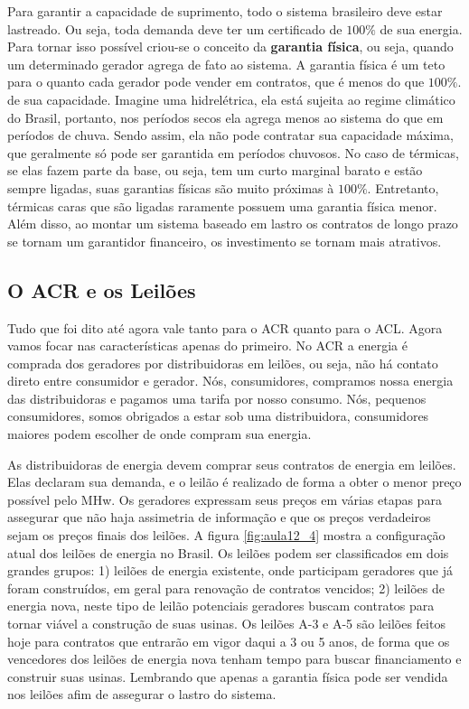 Para garantir a capacidade de suprimento, todo o sistema brasileiro deve estar lastreado. Ou seja, toda demanda deve ter um certificado de $100\%$ de sua energia. Para tornar isso possível criou-se o conceito da \textbf{garantia física}, ou seja, quando um determinado gerador agrega de fato ao sistema. A garantia física é um teto para o quanto cada gerador pode vender em contratos, que é menos do que $100\%$. de sua capacidade. Imagine uma hidrelétrica, ela está sujeita ao regime climático do Brasil, portanto, nos períodos secos ela agrega menos ao sistema do que em períodos de chuva. Sendo assim, ela não pode contratar sua capacidade máxima, que geralmente só pode ser garantida em períodos chuvosos. No caso de térmicas, se elas fazem parte da base, ou seja, tem um curto marginal barato e estão sempre ligadas, suas garantias físicas são muito próximas à $100\%$. Entretanto, térmicas caras que são ligadas raramente possuem uma garantia física menor. 
Além disso, ao montar um sistema baseado em lastro os contratos de longo prazo se tornam um garantidor financeiro, os investimento se tornam mais atrativos. 

\subsection{O ACR e os Leilões}

Tudo que foi dito até agora vale tanto para o ACR quanto para o ACL. Agora vamos focar nas características apenas do primeiro. No ACR a energia é comprada dos geradores por distribuidoras em leilões, ou seja, não há contato direto entre consumidor e gerador. Nós, consumidores, compramos nossa energia das distribuidoras e pagamos uma tarifa por nosso consumo. Nós, pequenos consumidores, somos obrigados a estar sob uma distribuidora, consumidores maiores podem escolher de onde compram sua energia. 

As distribuidoras de energia devem comprar seus contratos de energia em leilões. Elas declaram sua demanda, e o leilão é realizado de forma a obter o menor preço possível pelo MHw. Os geradores expressam seus preços em várias etapas para assegurar que não haja assimetria de informação e que os preços verdadeiros sejam os preços finais dos leilões. A figura \ref{fig:aula12_4} mostra a configuração atual dos leilões de energia no Brasil. Os leilões podem ser classificados em dois grandes grupos: 1) leilões de energia existente, onde participam geradores que já foram construídos, em geral para renovação de contratos vencidos; 2) leilões de energia nova, neste tipo de leilão potenciais geradores buscam contratos para tornar viável a construção de suas usinas. Os leilões A-3 e A-5 são leilões feitos hoje para contratos que entrarão em vigor daqui a 3 ou 5 anos, de forma que os vencedores dos leilões de energia nova tenham tempo para buscar financiamento e construir suas usinas. Lembrando que apenas a garantia física pode ser vendida nos leilões afim de assegurar o lastro do sistema.  

